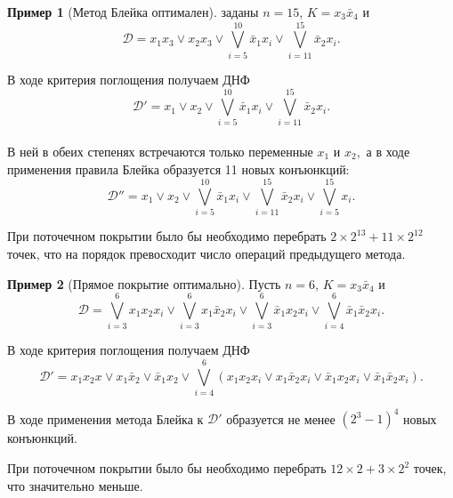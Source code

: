\documentclass[12pt,a4paper,oneside,fleqn,leqno]{article}
\theoremstyle{definition}
\newtheorem{example}{Пример}%
\begin{document}
		\begin{example}[Метод Блейка оптимален]
			\hspace{5pt} заданы $n = 15$, $K = x_3\bar{x}_4$ и 
			$$\mathcal{D} = x_1x_3 \vee x_2x_3 \vee \bigvee\limits_{i = 5}^{10}\bar{x}_1x_i \vee \bigvee\limits_{i = 11}^{15}\bar{x}_2x_i.$$\par
			В ходе критерия поглощения получаем ДНФ
			$$\mathcal{D}' = x_1 \vee x_2 \vee \bigvee\limits_{i = 5}^{10}\bar{x}_1x_i \vee \bigvee\limits_{i = 11}^{15}\bar{x}_2x_i.$$\\
			В ней в обеих степенях встречаются только переменные $x_1$ и $x_2,$ а в ходе применения правила Блейка образуется 11 новых конъюнкций:
			$$
				\mathcal{D}'' = x_1 \vee x_2 \vee \bigvee\limits_{i = 5}^{10}\bar{x}_1x_i \vee \bigvee\limits_{i = 11}^{15}\bar{x}_2x_i \vee \bigvee\limits_{i = 5}^{15}x_i.
			$$\par
			При поточечном покрытии было бы необходимо перебрать $2\times 2^{13} + {11}\times 2^{12}$ точек, что на порядок превосходит число операций предыдущего метода.
		\end{example}
		\begin{example}[Прямое покрытие оптимально]
			\hspace{5pt}\par Пусть $n = 6$, $K = x_3\bar{x}_4$ и 
			$$
				\mathcal{D} = \bigvee\limits_{i = 3}^6x_1x_2x_i \vee \bigvee\limits_{i = 3}^6x_1\bar{x}_2x_i \vee \bigvee\limits_{i = 3}^6\bar{x}_1x_2x_i \vee \bigvee\limits_{i = 4}^6\bar{x}_1\bar{x}_2x_i.
			$$\par
			В ходе критерия поглощения получаем ДНФ
			$$
				\mathcal{D}' = x_1x_2x \vee x_1\bar{x}_2 \vee \bar{x}_1x_2 \vee \bigvee\limits_{i = 4}^6(x_1x_2x_i \vee x_1\bar{x}_2x_i \vee \bar{x}_1x_2x_i \vee \bar{x}_1\bar{x}_2x_i).
			$$\par
			В ходе применения метода Блейка к $\mathcal{D}'$ образуется не менее $(2^3-1)^4$ новых конъюнкций.\par
			При поточечном покрытии было бы необходимо перебрать $12 \times 2 + 3 \times 2^2$ точек, что значительно меньше.
		\end{example}
\end{document}
